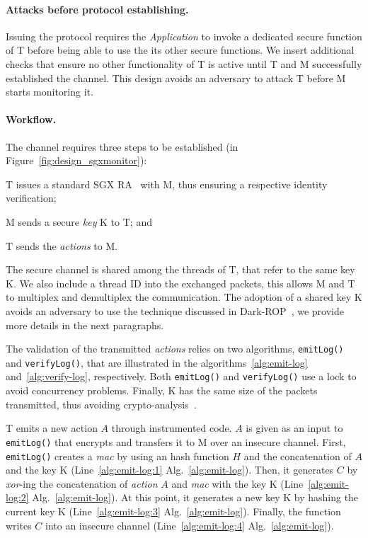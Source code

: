 \paragraph{Attacks before protocol establishing.} 
Issuing the protocol requires the \emph{Application} to invoke a dedicated 
secure function of T before being able to use the its other secure functions.
We insert additional checks that ensure no other 
functionality of T is active until T and M successfully established the channel.
This design avoids an adversary to attack T before M starts monitoring it.

\paragraph{Workflow.}
The channel requires three steps to be established (\circled[3] in 
Figure~\ref{fig:design_sgxmonitor}):
\begin{enumerate*}[label=(\roman*)]
	\item T issues a standard SGX RA~\citep{anati2013innovative} with M, thus 
	ensuring a respective identity verification;
	\item M sends a secure \emph{key} K to T; and
	\item T sends the \emph{actions} to M.
\end{enumerate*}
The secure channel is shared among the threads of T, that refer to the same 
key K.
We also include a thread ID into the exchanged packets, this allows M and T to 
multiplex and demultiplex the communication.
The adoption of a shared key K avoids an adversary to use 
the technique discussed in Dark-ROP~\citep{lee2017hacking}, we provide more 
details in the next paragraphs.

The validation of the transmitted \emph{actions} relies on two algorithms, 
\texttt{emitLog()} and \texttt{verifyLog()}, that are illustrated in the
algorithms~\ref{alg:emit-log} and~\ref{alg:verify-log}, respectively.
Both \texttt{emitLog()} and \texttt{verifyLog()} use a lock to avoid
concurrency problems.
Finally, K has the same size of the packets transmitted, thus avoiding 
crypto-analysis~\citep{horstmeyer2013physical}.

T emits a new action $A$ through instrumented code.
$A$ is given as an input to \texttt{emitLog()} that encrypts and transfers it 
to M over an insecure channel.
First,  \texttt{emitLog()} creates a \emph{mac} by using an hash function $H$ 
and the concatenation of $A$ and the key K (Line~\ref{alg:emit-log:1}  
Alg.~\ref{alg:emit-log}).
Then, it generates $C$ by \emph{xor}-ing the concatenation of \emph{action} $A$ 
and \emph{mac} with the key K (Line~\ref{alg:emit-log:2} 
Alg.~\ref{alg:emit-log}).
At this point, it generates a new key K by hashing the 
current key K (Line~\ref{alg:emit-log:3} Alg.~\ref{alg:emit-log}).
Finally, the function writes $C$ into an insecure channel 
(Line~\ref{alg:emit-log:4} Alg.~\ref{alg:emit-log}).


